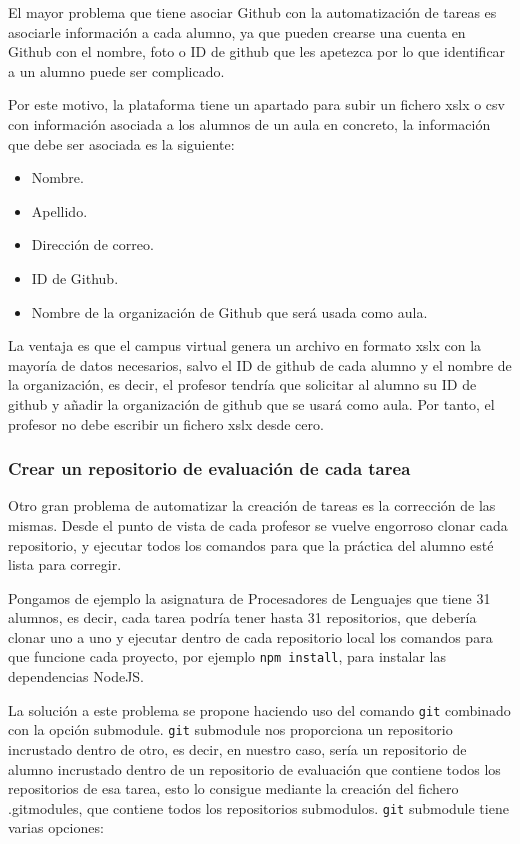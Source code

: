 El mayor problema que tiene asociar Github con la automatización de tareas es asociarle información a cada alumno, ya que pueden crearse una cuenta en Github con el nombre, foto o ID de github que les apetezca 
por lo que identificar a un alumno puede ser complicado. 

Por este motivo, la plataforma tiene un apartado para subir un fichero xslx o csv con información asociada a los alumnos de un aula en concreto, la información que debe ser asociada es la siguiente:

\begin{itemize}
  \item Nombre.
  \item Apellido.
  \item Dirección de correo.
  \item ID de Github.
  \item Nombre de la organización de Github que será usada como aula.
\end{itemize}

La ventaja es que el campus virtual genera un archivo en formato xslx con la mayoría de datos necesarios, salvo el ID de github de cada alumno y el nombre de la organización, es decir, el profesor tendría que solicitar al alumno su ID de github y añadir la organización de github que se usará como aula.
Por tanto, el profesor no debe escribir un fichero xslx desde cero.

\subsubsection{Crear un repositorio de evaluación de cada tarea}

Otro gran problema de automatizar la creación de tareas es la corrección de las mismas. Desde el punto de vista de cada profesor se vuelve engorroso clonar cada repositorio, y ejecutar todos los comandos para que la práctica del alumno esté lista para corregir.

Pongamos de ejemplo la asignatura de Procesadores de Lenguajes que tiene 31 alumnos, es decir, cada tarea podría tener hasta 31 repositorios, que debería clonar uno a uno y ejecutar dentro de cada repositorio local los comandos para que funcione cada proyecto, por ejemplo \verb|npm install|, para instalar las dependencias NodeJS.

La solución a este problema se propone haciendo uso del comando \verb|git| combinado con la opción submodule. \verb|git| submodule nos proporciona un repositorio incrustado dentro de otro, es decir, en nuestro caso, sería un repositorio de alumno incrustado dentro de un repositorio de evaluación que contiene todos los repositorios de esa tarea, esto lo consigue mediante la creación del fichero .gitmodules, que contiene todos los repositorios submodulos. \verb|git| submodule tiene varias opciones: 

